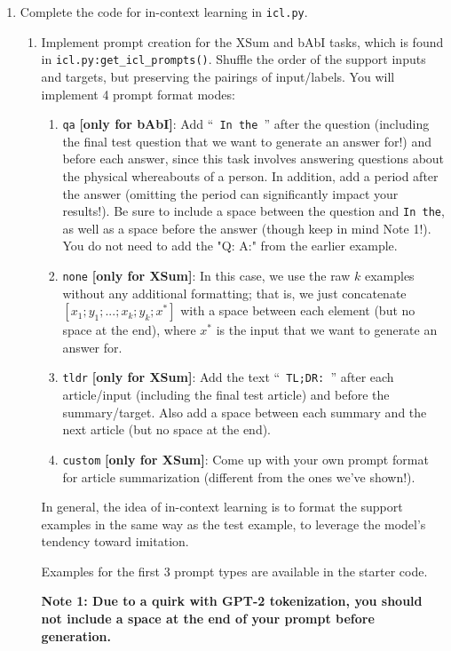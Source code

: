 \documentclass[12pt]{article}
\begin{document}
    \begin{enumerate}
        \item Complete the code for in-context learning in \texttt{icl.py}.
        \begin{enumerate}
            \item Implement prompt creation for the XSum and bAbI tasks, which is found in \texttt{icl.py:get\_icl\_prompts()}. Shuffle the order of the support inputs and targets, but preserving the pairings of input/labels. You will implement 4 prompt format modes:
            \begin{enumerate}
                \item \texttt{qa} \textbf{[only for bAbI]}: Add ``\texttt{ In the }'' after the question (including the final test question that we want to generate an answer for!) and before each answer, since this task involves answering questions about the physical whereabouts of a person. In addition, add a period after the answer (omitting the period can significantly impact your results!). Be sure to include a space between the question and \texttt{In the}, as well as a space before the answer (though keep in mind Note 1!). You do not need to add the "Q: A:" from the earlier example.
                \item \texttt{none} \textbf{[only for XSum]}: In this case, we use the raw $k$ examples without any additional formatting; that is, we just concatenate $[x_1; y_1; ... ; \allowbreak x_k; y_k; x^*]$ with a space between each element (but no space at the end), where $x^*$ is the input that we want to generate an answer for.
                \item \texttt{tldr} \textbf{[only for XSum]}: Add the text ``\texttt{ TL;DR: }'' after each article/input (including the final test article) and before the summary/target. Also add a space between each summary and the next article (but no space at the end).
                \item \texttt{custom} \textbf{[only for XSum]}: Come up with your own prompt format for article summarization (different from the ones we've shown!).
            \end{enumerate}
            In general, the idea of in-context learning is to format the support examples in the same way as the test example, to leverage the model's tendency toward imitation.

            Examples for the first 3 prompt types are available in the starter code.

            \textbf{Note 1: Due to a quirk with GPT-2 tokenization, you should not include a space at the end of your prompt before generation.}


\end{enumerate}
\end{enumerate}
\end{document}
